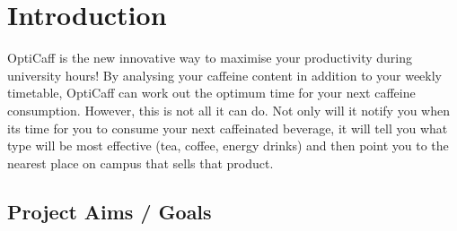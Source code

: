 \section{Introduction}

OptiCaff is the new innovative way to maximise your productivity during university hours! By analysing your caffeine content in addition to your weekly timetable, OptiCaff can work out the optimum time for your next caffeine consumption. However, this is not all it can do. Not only will it notify you when its time for you to consume your next caffeinated beverage, it will tell you what type will be most effective (tea, coffee, energy drinks) and then point you to the nearest place on campus that sells that product. 

\subsection{Project Aims / Goals}
